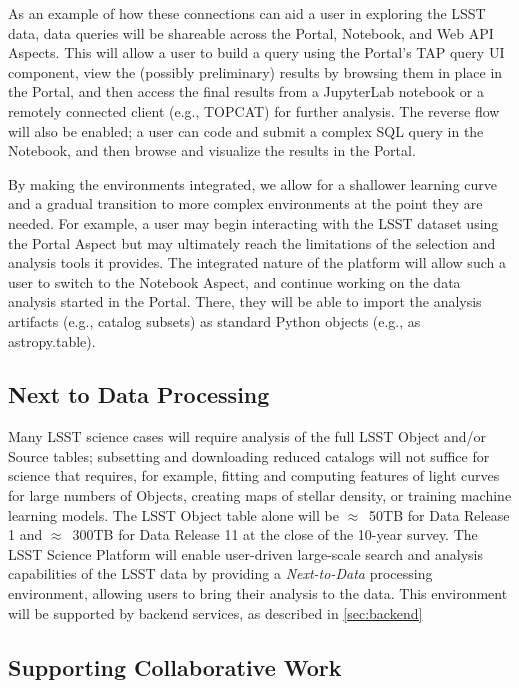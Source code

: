 As an example of how these connections can aid a user in exploring the LSST data, data queries will be shareable across the Portal, Notebook, and Web API Aspects.
This will allow a user to build a query using the Portal's TAP query UI component, view the (possibly preliminary) results by browsing them in place in the Portal, and then access the final results from a JupyterLab notebook or a remotely connected client (e.g., TOPCAT) for further analysis.
The reverse flow will also be enabled; a user can code and submit a complex SQL query in the Notebook, and then browse and visualize the results in the Portal.

By making the environments integrated, we allow for a shallower learning curve and a gradual transition to more complex environments at the point they are needed.
For example, a user may begin interacting with the LSST dataset using the Portal Aspect but may ultimately reach the limitations of the selection and analysis tools it provides.
The integrated nature of the platform will allow such a user to switch to the Notebook Aspect, and continue working on the data analysis started in the Portal.
There, they will be able to import the analysis artifacts (e.g., catalog subsets) as standard Python objects (e.g., as astropy.table).

\subsection{Next to Data Processing\label{sec:n2d}}
Many LSST science cases will require analysis of the full LSST Object and/or Source tables; subsetting and downloading reduced catalogs will not suffice for science that requires, for example, fitting and computing features of light curves for large numbers of Objects, creating maps of stellar density, or training machine learning models.
The LSST Object table alone will be $\approx$~50TB for Data Release 1 and $\approx$~300TB for Data Release 11 at the close of the 10-year survey.
The LSST Science Platform will enable user-driven large-scale search and analysis capabilities of the LSST data by providing a \textit{Next-to-Data} processing environment, allowing users to bring their analysis to the data.
This environment will be supported by backend services, as described in \ref{sec:backend}

\subsection{Supporting Collaborative Work\label{sec:collab}}

